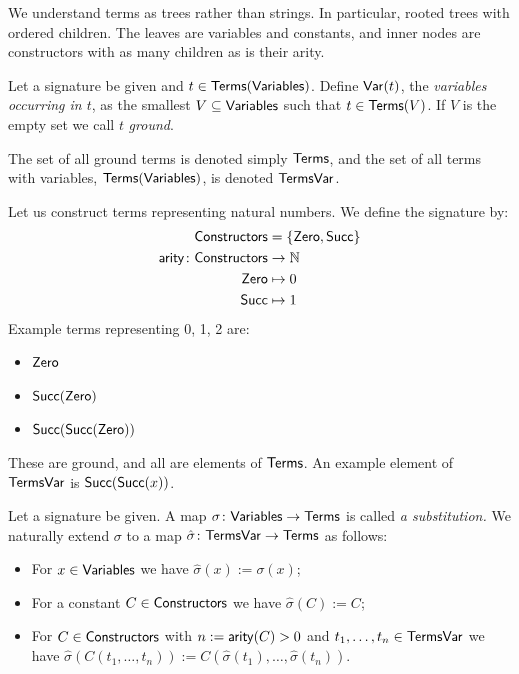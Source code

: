 \documentclass[11pt]{article}
\begin{document}
We understand terms as trees rather than strings. In particular, rooted trees with ordered
children. The leaves are variables and constants, and inner nodes are constructors
with as many children as is their arity.

\begin{definition}
Let a signature be given and $t \in \mathsf{Terms}(\mathsf{Variables})$. Define $\mathsf{Var}(t)$, the
\emph{variables occurring in $t$}, as the smallest $V \subseteq \mathsf{Variables}$ such that
$t \in \mathsf{Terms}(V)$. If $V$ is the empty set we call $t$ \emph{ground}.

The set of
all ground terms is denoted simply $\mathsf{Terms}$, and the set of all terms with
variables, $\mathsf{Terms}(\mathsf{Variables})$, is denoted $\mathsf{TermsVar}$.
\end{definition}

\begin{example}\label{ex:natural-numbers}
Let us construct terms representing natural numbers. We define the signature by:
\begin{align*}
  \mathsf{Constructors} &= \{\mathsf{Zero}, \mathsf{Succ}\} \\
  \mathsf{arity} \colon \mathsf{Constructors} &\to \mathbb{N} \\
  \mathsf{Zero} &\mapsto 0 \\
  \mathsf{Succ} &\mapsto 1
\end{align*}
Example terms representing 0, 1, 2 are:
\begin{itemize}
  \item $\mathsf{Zero}$
  \item $\mathsf{Succ}(\mathsf{Zero})$
  \item $\mathsf{Succ}(\mathsf{Succ}(\mathsf{Zero}))$
\end{itemize}
These are ground, and all are elements of $\mathsf{Terms}$. An example element of $\mathsf{TermsVar}$
is $\mathsf{Succ}(\mathsf{Succ}(x))$.
\end{example}

\begin{definition}[Substitution]
Let a signature be given. A map $\sigma \colon \mathsf{Variables} \to \mathsf{Terms}$ is
called \emph{a substitution.} We naturally extend $\sigma$ to a map
$\hat{\sigma} \colon \mathsf{TermsVar} \to \mathsf{Terms}$ as follows:
\begin{itemize}
  \item For $x \in \mathsf{Variables}$ we have $\hat{\sigma}(x) := \sigma(x)$;
  \item For a constant $C \in \mathsf{Constructors}$ we have $\hat{\sigma}(C) := C$;
  \item For $C \in \mathsf{Constructors}$ with $n := \mathsf{arity}(C) > 0$ and $t_1, \dots, t_n \in \mathsf{TermsVar}$
        we have $\hat{\sigma}(C(t_1, \dots, t_n)) := C(\hat{\sigma}(t_1), \dots, \hat{\sigma}(t_n))$.
\end{itemize}
\end{definition}
\end{document}
